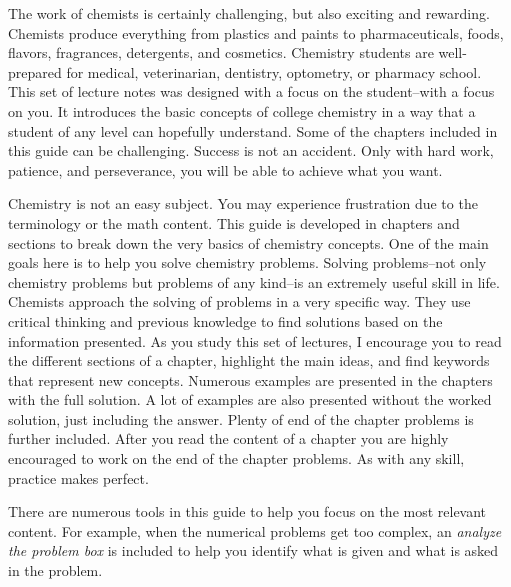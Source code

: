 \documentclass[main.tex]{subfiles}
\begin{document}
\pagestyle{style1}

\begin{fullwidth}
\begin{multicols*}{2}
The work of chemists is certainly challenging, but also exciting and rewarding. Chemists produce everything from plastics and paints to pharmaceuticals, foods, flavors, fragrances, detergents, and cosmetics. Chemistry students are well-prepared for medical, veterinarian, dentistry, optometry, or pharmacy school. This set of lecture notes was designed with a focus on the student--with a focus on you. It introduces the basic concepts of college chemistry in a way that a student of any level can hopefully understand. Some of the chapters included in this guide can be challenging. Success is not an accident. Only with hard work, patience, and perseverance, you will be able to achieve what you want. 

Chemistry is not an easy subject. You may experience frustration due to the terminology or the math content. This guide is developed in chapters and sections to break down the very basics of chemistry concepts. One of the main goals here is to help you solve chemistry problems. Solving problems--not only chemistry problems but problems of any kind--is an extremely useful skill in life. Chemists approach the solving of problems in a very specific way. They use critical thinking and previous knowledge to find solutions based on the information presented. As you study this set of lectures, I encourage you to read the different sections of a chapter, highlight the main ideas, and find keywords that represent new concepts. Numerous examples are presented in the chapters with the full solution. A lot of examples are also presented without the worked solution, just including the answer. Plenty of end of the chapter problems is further included. After you read the content of a chapter you are highly encouraged to work on the end of the chapter problems. As with any skill, practice makes perfect.

There are numerous tools in this guide to help you focus on the most relevant content. For example, when the numerical problems get too complex, an \emph{analyze the problem box} is included to help you identify what is given and what is asked in the problem.


\end{multicols*}
\end{fullwidth}
\end{document}
